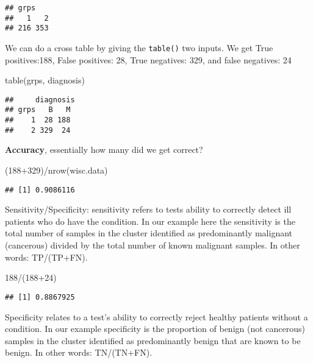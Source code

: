 \documentclass[
]{article}
\newenvironment{Shaded}{\begin{snugshade}}{\end{snugshade}}
\newcommand{\DecValTok}[1]{\textcolor[rgb]{0.00,0.00,0.81}{#1}}
\newcommand{\FunctionTok}[1]{\textcolor[rgb]{0.00,0.00,0.00}{#1}}
\newcommand{\NormalTok}[1]{#1}
\newcommand{\SpecialCharTok}[1]{\textcolor[rgb]{0.00,0.00,0.00}{#1}}
\begin{document}
\begin{verbatim}
## grps
##   1   2 
## 216 353
\end{verbatim}

We can do a cross table by giving the \texttt{table()} two inputs. We
get True positives:188, False positives: 28, True negatives: 329, and
false negatives: 24

\begin{Shaded}
\begin{Highlighting}[]
\FunctionTok{table}\NormalTok{(grps, diagnosis)}
\end{Highlighting}
\end{Shaded}

\begin{verbatim}
##     diagnosis
## grps   B   M
##    1  28 188
##    2 329  24
\end{verbatim}

\textbf{Accuracy}, essentially how many did we get correct?

\begin{Shaded}
\begin{Highlighting}[]
\NormalTok{(}\DecValTok{188}\SpecialCharTok{+}\DecValTok{329}\NormalTok{)}\SpecialCharTok{/}\FunctionTok{nrow}\NormalTok{(wisc.data)}
\end{Highlighting}
\end{Shaded}

\begin{verbatim}
## [1] 0.9086116
\end{verbatim}

Sensitivity/Specificity: sensitivity refers to tests ability to
correctly detect ill patients who do have the condition. In our example
here the sensitivity is the total number of samples in the cluster
identified as predominantly malignant (cancerous) divided by the total
number of known malignant samples. In other words: TP/(TP+FN).

\begin{Shaded}
\begin{Highlighting}[]
\DecValTok{188}\SpecialCharTok{/}\NormalTok{(}\DecValTok{188}\SpecialCharTok{+}\DecValTok{24}\NormalTok{)}
\end{Highlighting}
\end{Shaded}

\begin{verbatim}
## [1] 0.8867925
\end{verbatim}

Specificity relates to a test's ability to correctly reject healthy
patients without a condition. In our example specificity is the
proportion of benign (not cancerous) samples in the cluster identified
as predominantly benign that are known to be benign. In other words:
TN/(TN+FN).
\end{document}

